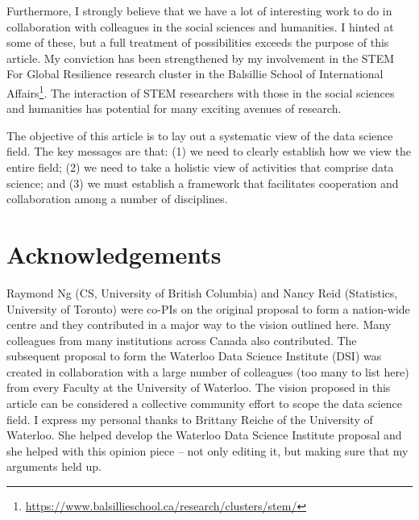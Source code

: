 \documentclass[11pt]{article}
\begin{document}
Furthermore, I strongly believe that we have a lot of interesting work to do in collaboration with colleagues in the social sciences and humanities. I hinted at some of these, but a full treatment of possibilities exceeds the purpose of this article. My conviction has been strengthened by my involvement in the STEM For Global Resilience research cluster in the Balsillie School of International Affairs\footnote{\url{https://www.balsillieschool.ca/research/clusters/stem/}}. The interaction of STEM researchers with those in the social sciences and humanities has potential for many exciting avenues of research.

The objective of this article is to lay out a systematic view of the data science field. The key messages are that: (1) we need to clearly establish how we view the entire field; (2) we need to take a holistic view of activities that comprise data science; and (3) we must establish a framework that facilitates cooperation and collaboration among a number of disciplines. 


\section{Acknowledgements}
Raymond Ng (CS, University of British Columbia) and Nancy Reid (Statistics, University of Toronto) were co-PIs on the original proposal to form a nation-wide centre and they contributed in a major way to the vision outlined here. Many colleagues from many institutions across Canada also contributed. The subsequent proposal to form the Waterloo Data Science Institute (DSI) was created in collaboration with a large number of colleagues (too many to list here) from every Faculty at the University of Waterloo. The vision proposed in this article can be considered a collective community effort to scope the data science field. I express my personal thanks to Brittany Reiche of the University of Waterloo. She helped develop the Waterloo Data Science Institute proposal and she helped with this opinion piece -- not only editing it, but making sure that my arguments held up.

%
%
%
\end{document}
